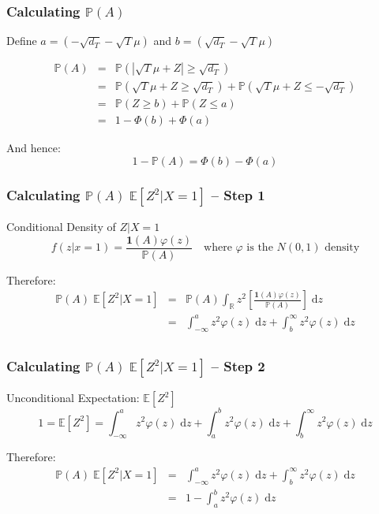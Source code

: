 \begin{frame}
  \frametitle{Calculating $\mathbb{P}(A)$}
  Define $a = (-\sqrt{d_T} - \sqrt{T}\mu)$ and $b = (\sqrt{d_T} - \sqrt{T}\mu)$ 

  \begin{eqnarray*}
    \mathbb{P}(A) &=& \mathbb{P}\left( |\sqrt{T}\mu + Z| \geq \sqrt{d_T} \right) \\
    &=& \mathbb{P}\left( \sqrt{T}\mu + Z \geq \sqrt{d_T} \right) + \mathbb{P}\left( \sqrt{T}\mu + Z \leq -\sqrt{d_T} \right) \\
    &=& \mathbb{P}(Z\geq b) + \mathbb{P}(Z \leq a)\\
    &=& 1 - \Phi(b) + \Phi(a)
  \end{eqnarray*}

  And hence:
  \[
    1 - \mathbb{P}(A) = \Phi(b) - \Phi(a)
  \]
\end{frame}
\begin{frame}
  \frametitle{Calculating $\mathbb{P}(A)\;\mathbb{E}[Z^2|X=1]$ -- Step 1}
  \begin{block}{Conditional Density of $Z|X=1$}
    \vspace{-1em}
    \[f(z|x=1) = \frac{\mathbf{1}(A)\varphi(z)}{\mathbb{P}(A)} \quad \text{where } \varphi \text{ is the } N(0,1) \text{ density} \]
  \end{block}

  \begin{block}{Therefore:}
    \begin{eqnarray*}
      \mathbb{P}(A)\; \mathbb{E}[Z^2|X=1] &=& \mathbb{P}(A) \int_{\mathbb{R}} z^2 \left[ \frac{\mathbf{1}(A)\varphi(z)}{\mathbb{P}(A)} \right]\; \text{d}z\\ 
       &=&  \int_{-\infty}^a z^2 \varphi(z)\; \text{d}z + \int_{b}^\infty z^2 \varphi(z)\; \text{d}z\\ 
    \end{eqnarray*}
  \end{block}
\end{frame}
\begin{frame}
  \frametitle{Calculating $\mathbb{P}(A)\; \mathbb{E}[Z^2|X=1]$ -- Step 2}
  \begin{block}{Unconditional Expectation: $\mathbb{E}[Z^2]$}
    \[
      1 = \mathbb{E}[Z^2]  = 
      \int_{-\infty}^a z^2 \varphi(z)\; \text{d}z +
      \int_{a}^b z^2 \varphi(z)\; \text{d}z +
      \int_{b}^\infty z^2 \varphi(z)\; \text{d}z
    \]
  \end{block}

  \begin{block}{Therefore:}
    \begin{eqnarray*}
      \mathbb{P}(A)\; \mathbb{E}[Z^2|X=1] &=&  \int_{-\infty}^a z^2 \varphi(z)\; \text{d}z + \int_{b}^\infty z^2 \varphi(z)\; \text{d}z\\ 
       &=& 1 - \int_a^b z^2 \varphi(z)\; \text{d}z
    \end{eqnarray*}
  \end{block}
\end{frame}
